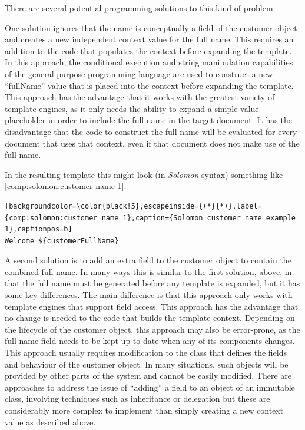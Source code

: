 There are several potential programming solutions to this kind of problem.

One solution ignores that the name is conceptually a field of the customer object and creates a new independent context value for the full name. This requires an addition to the code that populates the context before expanding the template. In this approach, the conditional execution and string manipulation capabilities of the general-purpose \gls{programming language} are used to construct a new \enquote{fullName} value that is placed into the context before expanding the template. This approach has the advantage that it works with the greatest variety of \gls{template engine}s, as it only needs the ability to expand a simple value placeholder in order to include the full name in the target document. It has the disadvantage that the code to construct the full name will be evaluated for every document that uses that context, even if that document does not make use of the full name.

In the resulting template this might look (in \emph{Solomon} syntax) something like \autoref{comp:solomon:customer name 1}.

\begin{lstlisting}[backgroundcolor=\color{black!5},escapeinside={(*}{*)},label={comp:solomon:customer name 1},caption={Solomon customer name example 1},captionpos=b]
Welcome ${customerFullName}
\end{lstlisting}

A second solution is to add an extra field to the customer object to contain the combined full name. In many ways this is similar to the first solution, above, in that the full name must be generated before any template is expanded, but it has some key differences. The main difference is that this approach only works with \gls{template engine}s that support field access. This approach has the advantage that no change is needed to the code that builds the template context. Depending on the lifecycle of the customer object, this approach may also be error-prone, as the full name field needs to be kept up to date when any of its components changes. This approach usually requires modification to the class that defines the fields and behaviour of the customer object. In many situations, such objects will be provided by other parts of the system and cannot be easily modified. There are approaches to address the issue of \enquote{adding} a field to an object of an immutable class, involving techniques such as inheritance or delegation \citep{ConnollyBree2020} but these are considerably more complex to implement than simply creating a new context value as described above.

